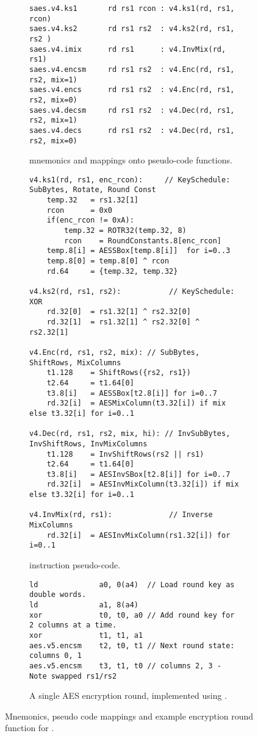 
%

\begin{figure}[h]
\begin{subfigure}{\textwidth}
\begin{lstlisting}[language=pseudo,style=block]
saes.v4.ks1       rd rs1 rcon : v4.ks1(rd, rs1, rcon)
saes.v4.ks2       rd rs1 rs2  : v4.ks2(rd, rs1, rs2 )
saes.v4.imix      rd rs1      : v4.InvMix(rd, rs1)
saes.v4.encsm     rd rs1 rs2  : v4.Enc(rd, rs1, rs2, mix=1)
saes.v4.encs      rd rs1 rs2  : v4.Enc(rd, rs1, rs2, mix=0)
saes.v4.decsm     rd rs1 rs2  : v4.Dec(rd, rs1, rs2, mix=1)
saes.v4.decs      rd rs1 rs2  : v4.Dec(rd, rs1, rs2, mix=0)
\end{lstlisting}
\caption{
 mnemonics and mappings onto pseudo-code functions.
}
\label{fig:mnemonics:v4}
\end{subfigure}
\begin{subfigure}{\textwidth}
\begin{lstlisting}[language=pseudo,style=block]
v4.ks1(rd, rs1, enc_rcon):     // KeySchedule: SubBytes, Rotate, Round Const
    temp.32   = rs1.32[1]
    rcon      = 0x0
    if(enc_rcon != 0xA):
        temp.32 = ROTR32(temp.32, 8)
        rcon    = RoundConstants.8[enc_rcon]
    temp.8[i] = AESSBox[temp.8[i]]  for i=0..3
    temp.8[0] = temp.8[0] ^ rcon
    rd.64     = {temp.32, temp.32}

v4.ks2(rd, rs1, rs2):           // KeySchedule: XOR
    rd.32[0]  = rs1.32[1] ^ rs2.32[0]
    rd.32[1]  = rs1.32[1] ^ rs2.32[0] ^ rs2.32[1]

v4.Enc(rd, rs1, rs2, mix): // SubBytes, ShiftRows, MixColumns
    t1.128    = ShiftRows({rs2, rs1})
    t2.64     = t1.64[0]
    t3.8[i]   = AESSBox[t2.8[i]] for i=0..7
    rd.32[i]  = AESMixColumn(t3.32[i]) if mix else t3.32[i] for i=0..1

v4.Dec(rd, rs1, rs2, mix, hi): // InvSubBytes, InvShiftRows, InvMixColumns
    t1.128    = InvShiftRows(rs2 || rs1)
    t2.64     = t1.64[0]
    t3.8[i]   = AESInvSBox[t2.8[i]] for i=0..7
    rd.32[i]  = AESInvMixColumn(t3.32[i]) if mix else t3.32[i] for i=0..1

v4.InvMix(rd, rs1):             // Inverse MixColumns
    rd.32[i]  = AESInvMixColumn(rs1.32[i]) for i=0..1
\end{lstlisting}
\caption{
     instruction pseudo-code.
}
\label{fig:pseudo:v4}
\end{subfigure}
\begin{subfigure}{\textwidth}
\begin{lstlisting}[language=pseudo,style=block]
ld              a0, 0(a4)  // Load round key as double words.
ld              a1, 8(a4)
xor             t0, t0, a0 // Add round key for 2 columns at a time.
xor             t1, t1, a1
aes.v5.encsm    t2, t0, t1 // Next round state: columns 0, 1
aes.v5.encsm    t3, t1, t0 // columns 2, 3 - Note swapped rs1/rs2
\end{lstlisting}
\caption{
A single AES encryption round, implemented using .
}
\label{fig:round:v4}
\end{subfigure}
\caption{
    Mnemonics, pseudo code mappings and example encryption
    round function for .
}
\end{figure}
